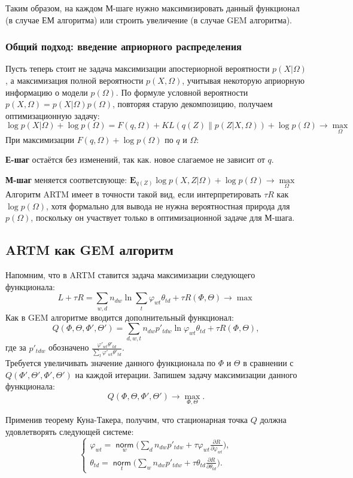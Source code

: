 \documentclass[12pt]{article}
\renewcommand{\phi}{\varphi}
\newcommand{\norm}{\mathop{\mathsf{norm}}\limits}
\begin{document}
Таким образом, на каждом М-шаге нужно максимизировать данный функционал (в случае ЕМ алгоритма) или строить увеличение (в случае GEM алгоритма).
\subsubsection{Общий подход: введение априорного распределения}
Пусть теперь стоит не задача максимизации апостериорной вероятности $p(X|\Omega)$, а максимизация полной вероятности $p(X, \Omega)$, учитывая некоторую априорную информацию о модели $p(\Omega)$. По формуле условной вероятности $p(X, \Omega) = p(X|\Omega) p(\Omega)$, повторяя старую декомпозицию, получаем оптимизационную задачу:
\[
\log p(X|\Omega) + \log p(\Omega) = F(q, \Omega) + KL(q(Z)\|p(Z|X,\Omega)) + \log p(\Omega) \to \max\limits_{\Omega}
\]
При максимизации $ F(q, \Omega) + \log p(\Omega)$ по $q$ и $\Omega$:

\textbf{Е-шаг} остаётся без изменений, так как. новое слагаемое не зависит от $q$.

\textbf{М-шаг} меняется соответсвующе: $\mathbf{E}_{q(Z)} \log p(X, Z|\Omega) + \log p(\Omega)\to \max\limits_{\Omega}$\\
Алгоритм ARTM имеет в точности такой вид, если интерпретировать $\tau R$ как $\log p(\Omega)$, хотя формально для вывода не нужна вероятностная природа для $p(\Omega)$, поскольку он участвует только в оптимизационной задаче для М-шага.
	\subsection{ARTM как GEM алгоритм}
\label{subsec:artmasgem}

Напомним, что в ARTM ставится задача максимизации следующего функционала:
\[
L + \tau R = \sum_{w,d} n_{dw} \ln\sum_t \phi_{wt} \theta_{td} + \tau R(\Phi, \Theta) \to \max
\]
Как в  GEM алгоритме вводится дополнительный функционал:
\[
	Q(\Phi, \Theta, \Phi', \Theta') = \sum\limits_{d, w, t} n_{dw} p'_{tdw} \ln{\phi_{wt}\theta_{td}} + \tau R(\Phi, \Theta),
\]
где за $p'_{tdw}$ обозначено $\frac{\phi'_{wt} \theta'_{td}}{\sum\limits_t \phi'_{wt} \theta'_{td}}$.\\

Требуется увеличивать значение данного функционала по $\Phi$ и $\Theta$ в сравнении с $Q(\Phi', \Theta', \Phi', \Theta')$ на каждой итерации. Запишем задачу максимизации данного функционала:
\[
Q(\Phi, \Theta, \Phi', \Theta') \to \max_{\Phi, \Theta}.
\]

Применив теорему Куна-Такера,  получим, что стационарная точка $Q$ должна удовлетворять следующей системе:
\[
\left\{
	\begin{aligned}
		\phi_{wt}= \norm_w \bigg( \sum\limits_d n_{dw} p'_{tdw} + \tau\phi_{wt} \frac{\partial{R}}{\partial{\phi_{wt}}} \bigg),\\
		\theta_{td} = \norm_t \bigg( \sum\limits_w n_{dw} p'_{tdw} + \tau\theta_{td} \frac{\partial{R}}{\partial{\theta_{td}}} \bigg).
	\end{aligned}
\right.
\]
\end{document}
